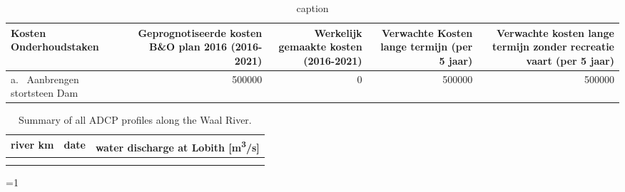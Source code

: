 \begin{table}[ht]
	\begin{center}
	\begin{adjustwidth}{-3cm}{-3cm}
			\begin{tabular}{p{5cm}rrrr}	
				\toprule
\rowcolor{dblue1} Kosten Onderhoudstaken	& \begin{minipage}[t]{2.5cm} Geprognotiseerde kosten B\&O plan 2016 (2016-2021)	\end{minipage} & \begin{minipage}[t]{2.5cm} Werkelijk gemaakte kosten (2016-2021)	\end{minipage} & \begin{minipage}[t]{2.5cm} Verwachte Kosten lange termijn (per 5 jaar) \end{minipage} & \begin{minipage}[t]{2.5cm} Verwachte kosten lange termijn zonder recreatie vaart  (per 5 jaar) \end{minipage} \\
				\midrule
a.~ Aanbrengen stortsteen Dam													& \num{500000} 		& \num{0				} & \num{	500000		} & \num{500000} \\
				\bottomrule
			\end{tabular}
			\caption{caption}
			\label{tab:vH21cost}
			\end{adjustwidth}
	\end{center}
\end{table}


\begin{longtable}{rrp{3cm}}
			\hline		
			river km & date & water discharge at Lobith [\si{m^3/s}]	 \\
			\midrule
			\endhead
 \\ %
			\bottomrule
		\caption{Summary of all ADCP profiles along the Waal River.}
		\label{tab:table_prepos_all_all}
\end{longtable}

%

\newcommand{\addAppendix}{1} %

\ifnum \addAppendix=1
\fi


